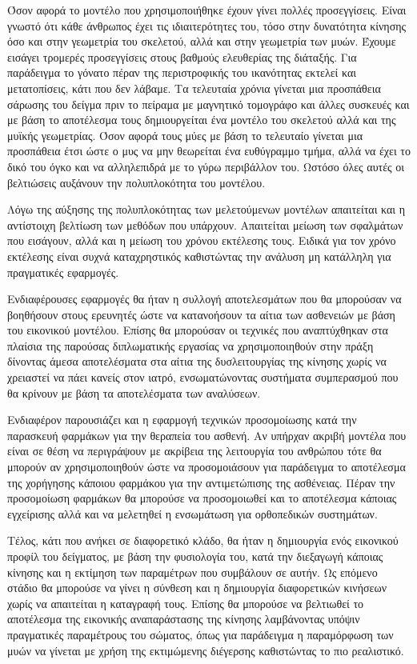 Όσον αφορά το μοντέλο που χρησιμοποιήθηκε έχουν γίνει πολλές προσεγγίσεις. Είναι γνωστό ότι κάθε άνθρωπος έχει τις ιδιαιτερότητες του, τόσο στην δυνατότητα κίνησης όσο και στην γεωμετρία του σκελετού, αλλά και στην γεωμετρία των μυών. Έχουμε εισάγει τρομερές προσεγγίσεις στους βαθμούς ελευθερίας της διάταξής. Για παράδειγμα το γόνατο πέραν της περιστροφικής του ικανότητας εκτελεί και μετατοπίσεις, κάτι που δεν λάβαμε. Τα τελευταία χρόνια γίνεται μια προσπάθεια σάρωσης του δείγμα πριν το πείραμα με μαγνητικό τομογράφο και άλλες συσκευές και με βάση το αποτέλεσμα τους δημιουργείται ένα μοντέλο του σκελετού αλλά και της μυϊκής γεωμετρίας. Όσον αφορά τους μύες με βάση το τελευταίο γίνεται μια προσπάθεια έτσι ώστε ο μυς να μην θεωρείται ένα ευθύγραμμο τμήμα, αλλά να έχει το δικό του όγκο και να αλληλεπιδρά με το γύρω περιβάλλον του. Ωστόσο όλες αυτές οι βελτιώσεις αυξάνουν την πολυπλοκότητα του μοντέλου.

Λόγω της αύξησης της πολυπλοκότητας των μελετούμενων μοντέλων απαιτείται και η αντίστοιχη βελτίωση των μεθόδων που υπάρχουν. Απαιτείται μείωση των σφαλμάτων που εισάγουν, αλλά και η μείωση του χρόνου εκτέλεσης τους. Ειδικά για τον χρόνο εκτέλεσης είναι συχνά καταχρηστικός καθιστώντας την ανάλυση μη κατάλληλη για πραγματικές εφαρμογές.

Ενδιαφέρουσες εφαρμογές θα ήταν η συλλογή αποτελεσμάτων που θα μπορούσαν να βοηθήσουν στους ερευνητές ώστε να κατανοήσουν τα αίτια των ασθενειών με βάση του εικονικού μοντέλου. Επίσης θα μπορούσαν οι τεχνικές που αναπτύχθηκαν στα πλαίσια της παρούσας διπλωματικής εργασίας να χρησιμοποιηθούν στην πράξη δίνοντας άμεσα αποτελέσματα στα αίτια της δυσλειτουργίας της κίνησης χωρίς να χρειαστεί να πάει κανείς στον ιατρό, ενσωματώνοντας συστήματα συμπερασμού που θα κρίνουν με βάση τα αποτελέσματα των αναλύσεων.

Ενδιαφέρον παρουσιάζει και η εφαρμογή τεχνικών προσομοίωσης κατά την παρασκευή φαρμάκων για την θεραπεία του ασθενή. Αν υπήρχαν ακριβή μοντέλα που είναι σε θέση να περιγράψουν με ακρίβεια της λειτουργία του ανθρώπου τότε θα μπορούν αν χρησιμοποιηθούν ώστε να προσομοιάσουν για παράδειγμα το αποτέλεσμα της χορήγησης κάποιου φαρμάκου για την αντιμετώπισης της ασθένειας. Πέραν την προσομοίωση φαρμάκων θα μπορούσε να προσομοιωθεί και το αποτέλεσμα κάποιας εγχείρισης αλλά και να μελετηθεί η ενσωμάτωση για ορθοπεδικών συστημάτων.

Τέλος, κάτι που ανήκει σε διαφορετικό κλάδο, θα ήταν η δημιουργία ενός εικονικού προφίλ του δείγματος, με βάση την φυσιολογία του, κατά την διεξαγωγή κάποιας κίνησης και η εκτίμηση των παραμέτρων που συμβάλουν σε αυτήν. Ως επόμενο στάδιο θα μπορούσε να γίνει η σύνθεση και η δημιουργία διαφορετικών κινήσεων χωρίς να απαιτείται η καταγραφή τους. Επίσης θα μπορούσε να βελτιωθεί το αποτέλεσμα της εικονικής αναπαράστασης της κίνησης λαμβάνοντας υπόψιν πραγματικές παραμέτρους του σώματος, όπως για παράδειγμα η παραμόρφωση των μυών να γίνεται με χρήση της εκτιμώμενης διέγερσης καθιστώντας το πιο ρεαλιστικό.

